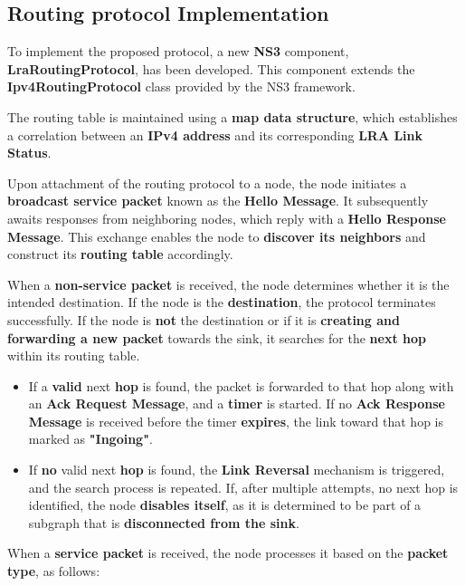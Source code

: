 \documentclass[../report.tex]{subfiles}
\begin{document}
\subsection{Routing protocol Implementation}
To implement the proposed protocol, a new \textbf{NS3} component, \textbf{LraRoutingProtocol}, has been developed. This component extends the \textbf{Ipv4RoutingProtocol} class provided by the NS3 framework.

The routing table is maintained using a \textbf{map data structure}, which establishes a correlation between an \textbf{IPv4 address} and its corresponding \textbf{LRA Link Status}.

Upon attachment of the routing protocol to a node, the node initiates a \textbf{broadcast service packet} known as the \textbf{Hello Message}. It subsequently awaits responses from neighboring nodes, which reply with a \textbf{Hello Response Message}. This exchange enables the node to \textbf{discover its neighbors} and construct its \textbf{routing table} accordingly.

When a \textbf{non-service packet} is received, the node determines whether it is the intended destination. If the node is the \textbf{destination}, the protocol terminates successfully. If the node is \textbf{not} the destination or if it is \textbf{creating and forwarding a new packet} towards the sink, it searches for the \textbf{next hop} within its routing table. 

\begin{itemize}
    \item If a \textbf{valid} next \textbf{hop} is found, the packet is forwarded to that hop along with an \textbf{Ack Request Message}, and a \textbf{timer} is started. If no \textbf{Ack Response Message} is received before the timer \textbf{expires}, the link toward that hop is marked as \textbf{"Ingoing"}.
\end{itemize}

\begin{itemize}
    \item If \textbf{no} valid next \textbf{hop} is found, the \textbf{Link Reversal} mechanism is triggered, and the search process is repeated. If, after multiple attempts, no next hop is identified, the node \textbf{disables itself}, as it is determined to be part of a subgraph that is \textbf{disconnected from the sink}.
\end{itemize}

When a \textbf{service packet} is received, the node processes it based on the \textbf{packet type}, as follows:
\end{document}
